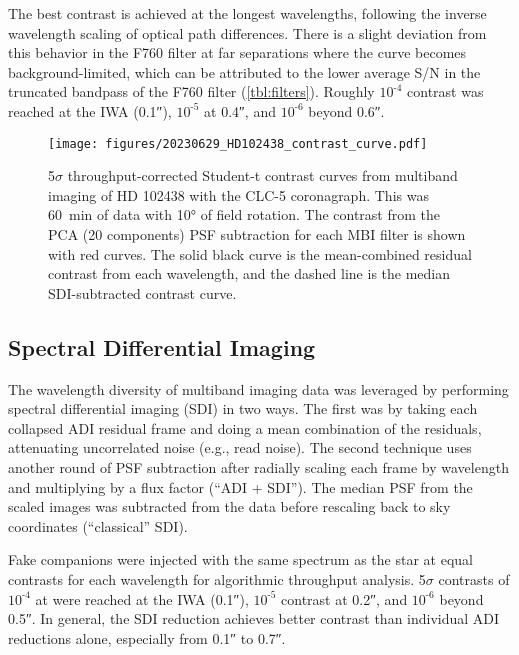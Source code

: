 The best contrast is achieved at the longest wavelengths, following the inverse wavelength scaling of optical path differences. There is a slight deviation from this behavior in the F760 filter at far separations where the curve becomes background-limited, which can be attributed to the lower average S/N in the truncated bandpass of the F760 filter (\autoref{tbl:filters}). Roughly $10^{\text{-}4}$ contrast was reached at the IWA (\ang{;;0.1}), $10^{\text{-}5}$ at \ang{;;0.4}, and $10^{\text{-}6}$ beyond \ang{;;0.6}.


\begin{figure}
    \centering
    \texttt{[image: figures/20230629\_HD102438\_contrast\_curve.pdf]}
    \caption{5$\sigma$ throughput-corrected Student-t contrast curves from multiband imaging of HD 102438 with the CLC-5 coronagraph. This was \SI{60}{\minute} of data with \ang{10} of field rotation. The contrast from the PCA (20 components) PSF subtraction for each MBI filter is shown with red curves. The solid black curve is the mean-combined residual contrast from each wavelength, and the dashed line is the median SDI-subtracted contrast curve. \label{fig:contrast_curves}}
\end{figure}


\subsection{Spectral Differential Imaging}\label{sec:sdi}

The wavelength diversity of multiband imaging data was leveraged by performing spectral differential imaging (SDI) in two ways. The first was by taking each collapsed ADI residual frame and doing a mean combination of the residuals, attenuating uncorrelated noise (e.g., read noise). The second technique uses another round of PSF subtraction after radially scaling each frame by wavelength and multiplying by a flux factor (``ADI + SDI''). The median PSF from the scaled images was subtracted from the data before rescaling back to sky coordinates (``classical'' SDI).

Fake companions were injected with the same spectrum as the star at equal contrasts for each wavelength for algorithmic throughput analysis. 5$\sigma$ contrasts of $10^{\text{-}4}$ at were reached at the IWA (\ang{;;0.1}), $10^{\text{-}5}$ contrast at \ang{;;0.2}, and $10^{\text{-}6}$ beyond \ang{;;0.5}. In general, the SDI reduction achieves better contrast than individual ADI reductions alone, especially from \ang{;;0.1} to \ang{;;0.7}.

